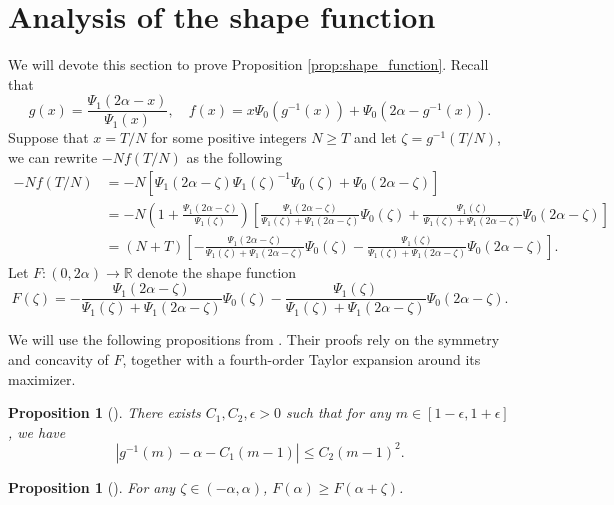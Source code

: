 \documentclass[11pt]{article}
\newtheorem{proposition}[theorem]{Proposition}
\theoremstyle{definition}
\newcommand{\R}{\mathbb{R}}
\begin{document}
\section{Analysis of the shape function}
We will devote this section to prove Proposition \ref{prop:shape_function}. Recall that 
\[
g(x) = \frac{\Psi_1(2\alpha - x)}{\Psi_1(x)}, \quad f(x) = x\Psi_0(g^{-1}(x)) + \Psi_0(2\alpha - g^{-1}(x)).
\]
Suppose that $x = T/N$ for some positive integers $N \geq T$ and let $\zeta = g^{-1}(T/N)$, we can rewrite $-Nf(T/N)$ as the following
\[
\begin{aligned}
    -Nf(T/N) &= -N\left[\Psi_1(2\alpha - \zeta)\Psi_1(\zeta)^{-1}\Psi_0(\zeta) + \Psi_0(2\alpha - \zeta)\right]\\
    &= -N\left(1+\frac{\Psi_1(2\alpha - \zeta)}{\Psi_1(\zeta) }\right)\left[ \frac{\Psi_1(2\alpha - \zeta)}{\Psi_1(\zeta) + \Psi_1(2\alpha - \zeta)}\Psi_0(\zeta) + \frac{\Psi_1(\zeta)}{\Psi_1(\zeta) + \Psi_1(2\alpha-\zeta)}\Psi_0(2\alpha - \zeta)\right]\\
    &= \left(N+T\right)\left[ -  \frac{\Psi_1(2\alpha - \zeta)}{\Psi_1(\zeta) + \Psi_1(2\alpha - \zeta)}\Psi_0(\zeta) - \frac{\Psi_1(\zeta)}{\Psi_1(\zeta) + \Psi_1(2\alpha-\zeta)}\Psi_0(2\alpha - \zeta)\right].
\end{aligned}
\]
Let $F: (0,2\alpha) \rightarrow \R$ denote the shape function 
\[
F\left(\zeta \right) = -  \frac{\Psi_1(2\alpha - \zeta)}{\Psi_1(\zeta) + \Psi_1(2\alpha - \zeta)}\Psi_0(\zeta) - \frac{\Psi_1(\zeta)}{\Psi_1(\zeta) + \Psi_1(2\alpha-\zeta)}\Psi_0(2\alpha - \zeta).
\]

We will use the following propositions from \cite{basu2024temporal}.
Their proofs rely on the symmetry and concavity of $F$, together with a fourth-order Taylor expansion around its maximizer.

\begin{proposition}[{\cite[Proposition~3.2]{basu2024temporal}}]\label{prop:slope}
    There exists $C_1, C_2, \epsilon > 0$ such that for any $m \in [1-\epsilon,1+ \epsilon]$, we have
    \begin{equation}
        \left| g^{-1}(m)-\alpha- C_1(m-1)\right| \leq C_2(m-1)^2.
    \end{equation}
\end{proposition}

\begin{proposition}[{\cite[Proposition 3.3]{basu2024temporal}}]\label{prop:peak}
    For any $\zeta \in (-\alpha, \alpha)$, $F(\alpha) \geq F(\alpha+\zeta)$.
\end{proposition}
\end{document}
